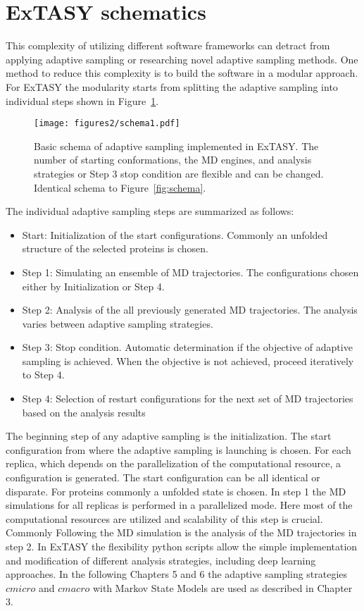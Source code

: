 {\section{\label{sec:design}ExTASY schematics}
This complexity of utilizing different software frameworks can detract from applying adaptive sampling or researching novel adaptive sampling methods. One method to reduce this complexity is to build the software in a modular approach. For ExTASY the modularity starts from splitting the adaptive sampling into individual steps shown in Figure~\ref{fig:schema2}.

\begin{figure}[h]
  \centering
  \texttt{[image: figures2/schema1.pdf]}
  \caption{Basic schema of adaptive sampling implemented in ExTASY. The
  number of starting conformations, the MD engines, and analysis strategies or Step 3 stop condition are flexible and can be changed. Identical schema to Figure~\ref{fig:schema}.}
  \label{fig:schema2}
\end{figure}

The individual adaptive sampling steps are summarized as follows:
\begin{itemize}
\item Start: Initialization of the start configurations.  Commonly an unfolded structure of the selected proteins is chosen.
\item Step 1: Simulating an ensemble of MD trajectories. The configurations chosen either by Initialization or Step 4. 
\item Step 2: Analysis of the all previously generated MD trajectories. The analysis varies between adaptive sampling strategies.
\item Step 3: Stop condition. Automatic determination if the objective of adaptive sampling is achieved. When the objective is not achieved, proceed iteratively to Step 4. 
\item Step 4: Selection of restart configurations for the next set of MD trajectories based on the analysis results 
\end{itemize}

The beginning step of any adaptive sampling is the initialization. The start configuration from where the adaptive sampling is launching is chosen. For each replica, which depends on the parallelization of the computational resource, a configuration is generated. The start configuration can be all identical or disparate. For proteins commonly a unfolded state is chosen.
In step 1 the MD simulations for all replicas is performed in a parallelized mode. Here most of the computational resources are utilized and scalability of this step is crucial. Commonly  
Following the MD simulation is the analysis of the MD trajectories in step 2. In ExTASY the flexibility python scripts allow the simple implementation and modification of different analysis strategies, including deep learning approaches\cite{Mardt2018}. In the following Chapters 5 and 6 the adaptive sampling strategies $cmicro$ and $cmacro$ with Markov State Models \cite{prinz2011markov} are used as described in Chapter 3. 

}
